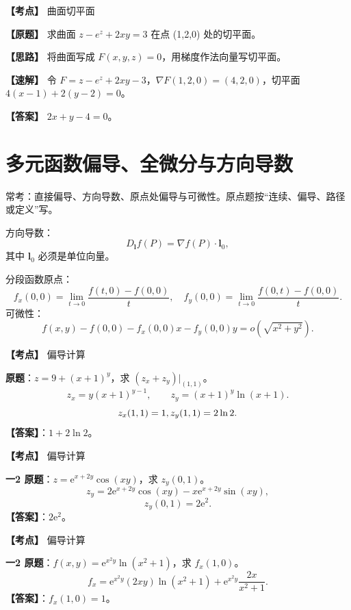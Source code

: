 ﻿\documentclass[11pt,a4paper,UTF8]{ctexart}
\newcommand{\ee}{\mathrm e}
\begin{document}
\begin{answerbox}[2021--2022 一-1]
\textbf{【考点】} 曲面切平面

\textbf{【原题】} 求曲面 $z-e^z+2xy=3$ 在点 (1,2,0) 处的切平面。

\textbf{【思路】} 将曲面写成 $F(x,y,z)=0$，用梯度作法向量写切平面。

\textbf{【速解】} 令 $F=z-e^z+2xy-3$，$\nabla F(1,2,0)=(4,2,0)$，切平面 $4(x-1)+2(y-2)=0$。

\textbf{【答案】} $2x+y-4=0$。
\end{answerbox}
\section{多元函数偏导、全微分与方向导数}

\begin{identifybox}[考频定位]
常考：直接偏导、方向导数、原点处偏导与可微性。原点题按“连续、偏导、路径或定义”写。
\end{identifybox}

\begin{templatebox}[考场模板]
方向导数：
\[
D_{\boldsymbol l}f(P)=\nabla f(P)\cdot \boldsymbol l_0,
\]
其中 $\boldsymbol l_0$ 必须是单位向量。

分段函数原点：
\[
f_x(0,0)=\lim_{t\to0}\frac{f(t,0)-f(0,0)}{t},\quad
f_y(0,0)=\lim_{t\to0}\frac{f(0,t)-f(0,0)}{t}.
\]
可微性：
\[
f(x,y)-f(0,0)-f_x(0,0)x-f_y(0,0)y=o(\sqrt{x^2+y^2}).
\]
\end{templatebox}

\begin{answerbox}[2020--2021 一-2]
\textbf{【考点】} 偏导计算

\textbf{原题}：$z=9+(x+1)^y$，求 $(z_x+z_y)|_{(1,1)}$。
\[
z_x=y(x+1)^{y-1},\qquad z_y=(x+1)^y\ln(x+1).
\]
\[
z_x(1,1)=1,\\ z_y(1,1)=2\ln2.
\]
\textbf{【答案】}：$1+2\ln2$。
\end{answerbox}

\begin{answerbox}[2021--2022 一-2]
\textbf{【考点】} 偏导计算

\textbf{一2 原题}：$z=\ee^{x+2y}\cos(xy)$，求 $z_y(0,1)$。
\[
z_y=2\ee^{x+2y}\cos(xy)-x\ee^{x+2y}\sin(xy),
\]
\[
z_y(0,1)=2\ee^2.
\]
\textbf{【答案】}：$2\ee^2$。

\end{answerbox}

\begin{answerbox}[2024--2025 一-2]
\textbf{【考点】} 偏导计算

\textbf{一2 原题}：$f(x,y)=\ee^{x^2y}\ln(x^2+1)$，求 $f_x(1,0)$。
\[
f_x=\ee^{x^2y}(2xy)\ln(x^2+1)+\ee^{x^2y}\frac{2x}{x^2+1}.
\]
\textbf{【答案】}：$f_x(1,0)=1$。

\end{answerbox}
\end{document}
